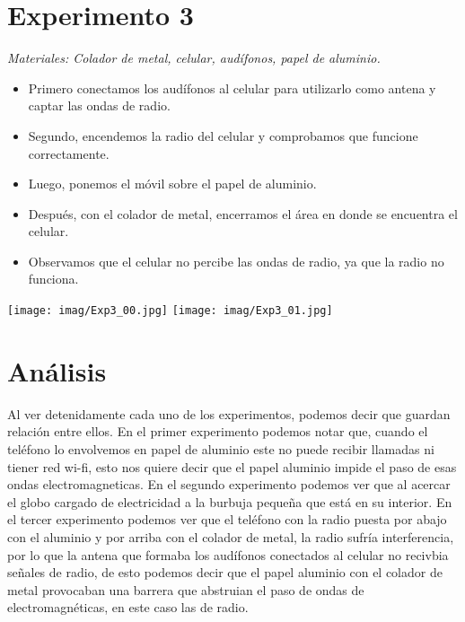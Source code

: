 \documentclass[]{article}
\newenvironment{Figura}
  {\par\medskip\noindent\minipage{\linewidth}}
  {\endminipage\par\medskip}
\begin{document}
\begin{multicols*}{2}
\section*{Experimento 3}
\textit{Materiales: Colador de metal, celular, audífonos, papel de aluminio.}
\vspace{-\topsep}
    \begin{itemize}
       \setlength{\parskip}{0pt} 
       \setlength{\itemsep}{0pt plus 1pt}
        \item Primero conectamos los audífonos al celular para utilizarlo como antena y captar las ondas de radio.
        \item Segundo, encendemos la radio del celular y comprobamos que funcione correctamente.
        \item Luego, ponemos el móvil sobre el papel de aluminio.
        \item Después, con el colador de metal, encerramos el área en donde se encuentra el celular.
        \item Observamos que el celular no percibe las ondas de radio, ya que la radio no funciona.
    \end{itemize}
\vspace{-\topsep}

\begin{Figura}
    \centering
    \texttt{[image: imag/Exp3\_00.jpg]}
    \texttt{[image: imag/Exp3\_01.jpg]}
\end{Figura}


    
\section*{Análisis}
Al ver detenidamente cada uno de los experimentos, podemos decir que guardan relación entre ellos.
En el primer experimento podemos notar que, cuando el teléfono lo envolvemos en papel de aluminio este no puede recibir llamadas ni tiener red wi-fi, esto nos quiere decir que el papel aluminio impide el paso de esas ondas electromagneticas.
En el segundo experimento podemos ver que al acercar el globo cargado de electricidad a la burbuja pequeña que está en su interior.%
En el tercer experimento podemos ver que el teléfono con la radio puesta por abajo con el aluminio y por arriba con el colador de metal, la radio sufría interferencia, por lo que la antena que formaba los audífonos conectados al celular no recivbia señales de radio, de esto podemos decir que el papel aluminio con el colador de metal provocaban una barrera que abstruian el paso de ondas de electromagnéticas, en este caso las de radio.


\end{multicols*}
\end{document}
